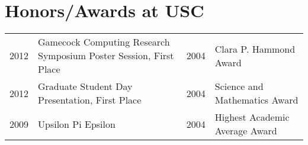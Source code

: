 \documentclass[a4paper,10pt]{article}
\begin{document}
\nocite{waggoner:13c}
\nocite{waggoner:11}
\nocite{wang:11}
\nocite{temlyakov:10}
\nocite{zhang:10}
\nocite{waggoner:12}
\nocite{barbu:12}
\nocite{zhang:12}

\renewcommand\refname{Selected Publications}
{\footnotesize }


\section{Honors/Awards at USC}
\begin{tabular}{r|p{8cm} l|p{5cm}}
2012 & \footnotesize{Gamecock Computing Research Symposium Poster Session,  First Place} &
2004 & Clara P. Hammond Award  \\

2012 & Graduate Student Day Presentation,  First Place &
2004 & Science and Mathematics Award \\

2009 & Upsilon Pi Epsilon &
2004 & Highest Academic Average Award \\
\end{tabular}

\newcommand{\skills}[2]{
  \item #2 #1
}
\end{document}
